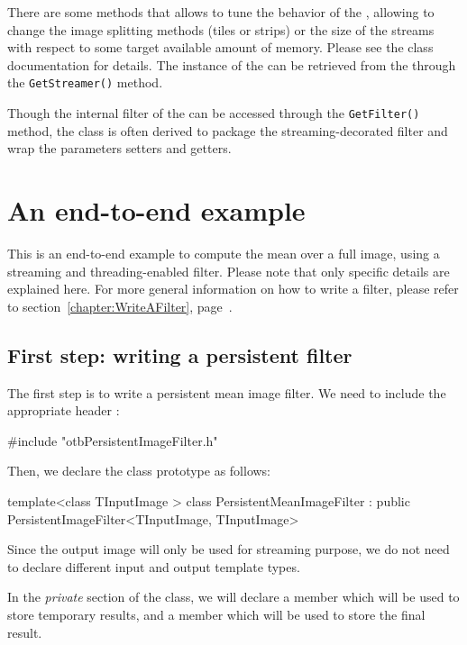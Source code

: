 There are some methods that allows to tune the behavior of the
, allowing to change the
image splitting methods (tiles or strips) or the size of the streams
with respect to some target available amount of memory. Please see the
class documentation for details. The instance of the
 can be retrieved from the
 through the
\verb?GetStreamer()? method.

Though the internal filter of the
 can be accessed
through the \verb?GetFilter()? method, the class is often derived to
package the streaming-decorated filter and wrap the parameters setters
and getters.

\section{An end-to-end example}

This is an end-to-end example to compute the mean over a full image,
using a streaming and threading-enabled filter. Please note that only
specific details are explained here. For more general information on
how to write a filter, please refer to
section~\ref{chapter:WriteAFilter}, page~\pageref{chapter:WriteAFilter}.

\subsection{First step: writing a persistent filter}

The first step is to write a persistent mean image filter. We need to
include the appropriate header :

\begin{cppcode}
#include "otbPersistentImageFilter.h"
\end{cppcode}

Then, we declare the class prototype as follows:

\begin{cppcode}
template<class TInputImage >
  class PersistentMeanImageFilter :
    public PersistentImageFilter<TInputImage, TInputImage>
\end{cppcode}

Since the output image will only be used for streaming purpose, we do
not need to declare different input and output template types.

In the \emph{private} section of the class, we will declare a member which
will be used to store temporary results, and a member which will be
used to store the final result.

